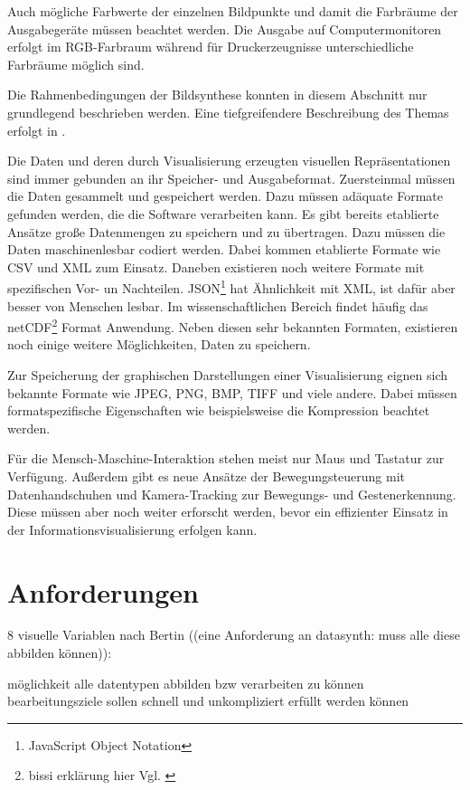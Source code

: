 \documentclass[a4paper, 12pt, DIVcalc, onepage, pdftex, headsepline, footsepline]{scrreprt}
\begin{document}
Auch mögliche Farbwerte der einzelnen Bildpunkte und damit die Farbräume der Ausgabegeräte
müssen beachtet werden. Die Ausgabe auf Computermonitoren erfolgt im RGB-Farbraum während
für Druckerzeugnisse unterschiedliche Farbräume möglich sind.

Die Rahmenbedingungen der Bildsynthese konnten in diesem Abschnitt nur grundlegend beschrieben
werden. Eine tiefgreifendere Beschreibung des Themas erfolgt in \citep{Computergrafik}.

Die Daten und deren durch Visualisierung erzeugten visuellen Repräsentationen sind immer
gebunden an ihr Speicher- und Ausgabeformat.
Zuersteinmal müssen die Daten gesammelt und gespeichert werden. Dazu müssen adäquate
Formate gefunden werden, die die Software verarbeiten kann. Es gibt bereits
etablierte Ansätze große Datenmengen zu speichern und zu übertragen. Dazu müssen
die Daten maschinenlesbar codiert werden. Dabei kommen etablierte Formate wie
CSV und XML zum Einsatz. Daneben existieren noch weitere Formate mit spezifischen
Vor- un Nachteilen. JSON\footnote{JavaScript Object Notation} hat Ähnlichkeit mit XML,
ist dafür aber besser von Menschen lesbar. Im wissenschaftlichen Bereich findet
häufig das netCDF\footnote{bissi erklärung hier Vgl. \citep{Schumann}} Format
Anwendung. Neben diesen sehr bekannten Formaten, existieren noch einige weitere
Möglichkeiten, Daten zu speichern.

Zur Speicherung der graphischen Darstellungen einer Visualisierung eignen sich bekannte
Formate wie JPEG, PNG, BMP, TIFF und viele andere. Dabei müssen formatspezifische
Eigenschaften wie beispielsweise die Kompression beachtet werden.

Für die Mensch-Maschine-Interaktion stehen meist nur Maus und Tastatur zur Verfügung.
Außerdem gibt es neue Ansätze der Bewegungsteuerung mit Datenhandschuhen und
Kamera-Tracking zur Bewegungs- und Gestenerkennung. Diese müssen aber noch weiter
erforscht werden, bevor ein effizienter Einsatz in der Informationsvisualisierung
erfolgen kann.

\section{Anforderungen}
\label{sec:Anforderungen}
8 visuelle Variablen nach Bertin ((eine Anforderung an datasynth: muss alle diese abbilden können)):

möglichkeit alle datentypen abbilden bzw verarbeiten zu können
bearbeitungsziele sollen schnell und unkompliziert erfüllt werden können
\end{document}
